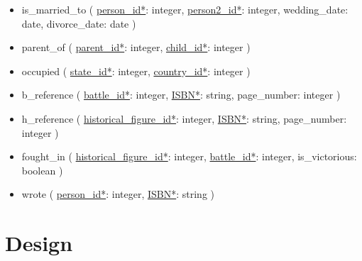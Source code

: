 \documentclass[11pt]{article}
\begin{document}
\begin{itemize}
\item is\_married\_to ( \uline{person\_id*}: integer, \uline{person2\_id*}: integer, wedding\_date: date, divorce\_date: date )
\item parent\_of ( \uline{parent\_id*}: integer, \uline{child\_id*}: integer )
\item occupied ( \uline{state\_id*}: integer, \uline{country\_id*}: integer )
\item b\_reference ( \uline{battle\_id*}: integer, \uline{ISBN*}: string, page\_number: integer )
\item h\_reference ( \uline{historical\_figure\_id*}: integer, \uline{ISBN*}: string, page\_number: integer )
\item fought\_in ( \uline{historical\_figure\_id*}: integer, \uline{battle\_id*}: integer, is\_victorious: boolean )
\item wrote ( \uline{person\_id*}: integer, \uline{ISBN*}: string )
\end{itemize}

\section{Design}
\label{sec:orge9fcb07}
\end{document}
